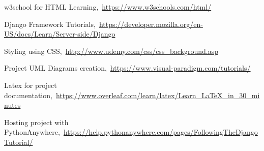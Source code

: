 \documentclass[12pt, a4paper]{report}
\begin{document}

\cleardoublepage
{}
{}
\begin{thebibliography}{99}
	
	w3school for HTML Learning,\ \url{https://www.w3schools.com/html/}
	
	Django Framework Tutorials,\ \url{https://developer.mozilla.org/en-US/docs/Learn/Server-side/Django}
	
	Styling using CSS,\ \url{http://www.udemy.com/css/css_background.asp}
	
	 Project UML Diagrams creation,\ \url{https://www.visual-paradigm.com/tutorials/}
	
	Latex for project documentation,\ \url{https://www.overleaf.com/learn/latex/Learn_LaTeX_in_30_minutes}
	
	Hosting project with PythonAnywhere,\ \url{https://help.pythonanywhere.com/pages/FollowingTheDjangoTutorial/}
\end{thebibliography}

	
\end{document}
